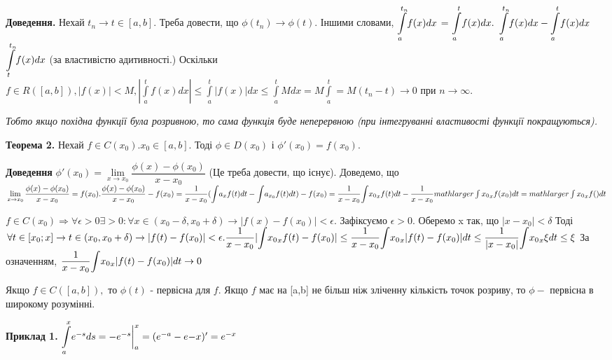 \documentclass[12pt]{report}
\begin{document}
\textbf{Доведення.} Нехай $ t_n \rightarrow t \in [a,b].$ Треба довести, що $ \phi(t_n) \rightarrow \phi(t)$. 
Іншими словами, $\mathlarger\int\limits_a^{t_{n}}f(x)dx  $ = 
$\mathlarger\int\limits_a^t f(x)dx .$  
$\mathlarger\int\limits_a^{t_n} f(x)dx  - \mathlarger\int\limits_a^t f(x)dx  $ $\mathlarger\int\limits_t^{t_{n}} f(x)dx $ (за 
властивістю адитивності.) Оскільки $ f \in R([a,b]), |f(x)|<M, |\int\limits_a^t f(x)dx | \leq \int\limits_a^t| f(x)|dx \leq \int\limits_a^t Mdx = M\int\limits_a^t = M(t_n - t) \rightarrow 0  $ при $ n \rightarrow \infty. $

\vspace{3mm} 
\textit{Тобто якщо похідна функції була розривною, то сама функція буде неперервною (при інтегруванні властивості функції покращуються).}

\vspace{5mm} 
\textbf{Теорема 2.} Нехай $f \in C({x_0}). $$x_0 \in [a,b]. $ Тоді $ \phi \in D({x_0}) $ і $ \phi ' (x_0) = f(x_0).$

\textbf{Доведення} $ \phi ' (x_0) =\lim\limits_{x \to x_0} \dfrac{\phi(x)-\phi(x_0) }{x - x_0} $
 (Це треба довести, що існує). Доведемо, що $ \lim\limits_{x \to x_0} \dfrac {\phi(x)-\phi(x_0) }{x - x_0} = f(x_0). \dfrac {\phi(x)-\phi(x_0) }{x - x_0} - f(x_0) = \dfrac {1}{x - x_0}(\mathlarger\int\limits a_x f(t)dt - \mathlarger\int\limits a_{x_0} f(t)dt ) - f(x_0) = \dfrac {1}{x - x_0} \mathlarger\int\limits {x_0}_{x} f(t)dt - \dfrac{1}{x-x_0} mathlarger\int\limits {x_0}_{x} f(x_0)dt = mathlarger\int\limits {x_0}_{x}  f()dt$
 
 $f\in C({x_0}) \Rightarrow \forall \epsilon > 0 \exists > 0: \forall x \in (x_0- \delta, x_0 + \delta)  \rightarrow |f(x)-f(x_0)| < \epsilon. $ Зафіксуємо $\epsilon > 0. $ Оберемо x так, що $|x- x_0| < \delta $ Тоді $\forall t \in [x_0; x] \rightarrow t \in (x_0, x_0 + \delta) \rightarrow |f(t) - f(x_0)| < \epsilon.  \dfrac{1}{x-x_0} |\mathlarger\int\limits {x_0}_{x} f(t)-f(x_0)| \leq 
 \dfrac{1}{x-x_0}\mathlarger\int\limits {x_0}_{x} |f(t)-f(x_0)| dt \leq \dfrac {1}{|x-x_0|}\mathlarger\int\limits {x_0}_{x} \xi 
 dt \leq \xi$
 За означенням, $\dfrac{1}{x-x_0} \mathlarger\int\limits {x_0}_{x} |f(t)-f(x_0)| dt \rightarrow 0$
 
 
 \vspace{5mm} 
Якщо $ f \in C ([a,b]) , $ то $ \phi (t) $ -  первісна для $f.$ Якщо $ f $ має на [a,b] не більш ніж зліченну кількість точок розриву, то $ \phi - $ первісна в широкому розумінні. 


 \vspace{5mm} 
\textbf{Приклад 1.} $\mathlarger\int\limits_{a}^{x} e^{-s}ds = -e^{-s}\bigg| ^{x}_{a} =( e^{-a} - e{-x})' = e^{-x}$
\end{document}
